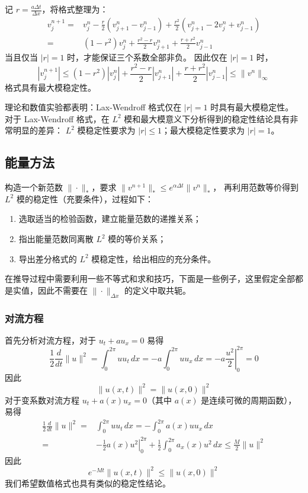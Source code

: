 \begin{solution*}
    记 $r = \frac{a \Delta t}{\Delta x}$，将格式整理为：
    \begin{align*}
        v_{j}^{n+1}
        ={} & v_j^n - \frac{r}2(v_{j+1}^n- v_{j-1}^n) + \frac{r^2}2
        (v_{j+1}^n-2v_{j}^n+v_{j-1}^n)                                          \\
        ={} & (1-r^2) v_j^n + \frac{r^2-r}2 v_{j+1}^n + \frac{r+r^2}2 v_{j-1}^n
    \end{align*}
    当且仅当 $|r|=1$ 时，才能保证三个系数全部非负。
    因此仅在 $|r| = 1$ 时，
    \[
        |v_{j}^{n+1}| \le{} (1-r^2) |v_j^n| + \frac{r^2-r}2 |v_{j+1}^n| + \frac{r+r^2}2 |v_{j-1}^n| \le \|v^n\|_\infty
    \]
    格式具有最大模稳定性。
\end{solution*}

\begin{remark}
    理论和数值实验都表明：Lax-Wendroff 格式仅在 $|r|=1$ 时具有最大模稳定性。
    对于 Lax-Wendroff 格式，在 $L^2$ 模和最大模意义下分析得到的稳定性结论具有非常明显的差异：
    $L^2$ 模稳定性要求为 $|r| \le 1$；最大模稳定性要求为 $|r|=1$。
\end{remark}


\subsection{能量方法}

构造一个新范数 $\|\cdot\|_*$，要求 $\| v^{n+1}\|_* \le e^{\alpha \Delta t} \| v^{n}\|_*$，
再利用范数等价得到 $L^2$ 模的稳定性（充要条件），过程如下：
\begin{enumerate}
    \item 选取适当的检验函数，建立能量范数的递推关系；
    \item 指出能量范数同离散 $L^2$ 模的等价关系；
    \item 导出差分格式的 $L^2$ 模稳定性，给出相应的充分条件。
\end{enumerate}
在推导过程中需要利用一些不等式和求和技巧，下面是一些例子，这里假定全部都是实值，因此不需要在 $\|\cdot\|_{\Delta x}$ 的定义中取共轭。


\subsubsection{对流方程}

首先分析对流方程，对于 $u_t + a u_x = 0$ 易得
\[
    \frac12 \frac{d}{dt} \|u\|^2 = \int_{0}^{2\pi} u u_t \,dx = - a \int_0^{2\pi} u u_x\,dx
    = - a \left. \frac{u^2}2 \right|_0^{2\pi} = 0
\]
因此
\[
    \| u(x,t) \|^2 = \| u(x,0) \|^2
\]
对于变系数对流方程 $u_t + a(x) u_x = 0$（其中 $a(x)$ 是连续可微的周期函数），易得
\begin{align*}
    \frac12 \frac{d}{dt} \|u\|^2 ={} & \int_{0}^{2\pi} u u_t \,dx = - \int_0^{2\pi} a(x) u u_x\,dx                         \\
    ={}                              & - \frac12 \left. a(x) u^2 \right|_0^{2\pi} + \frac12\int_{0}^{2\pi} a_x(x) u^2 \,dx
    \le{}  \frac{M}2 \| u \|^2
\end{align*}
因此
\[
    e^{- M t} \| u(x,t) \|^2 \le \| u(x,0) \|^2
\]
我们希望数值格式也具有类似的稳定性结论。

